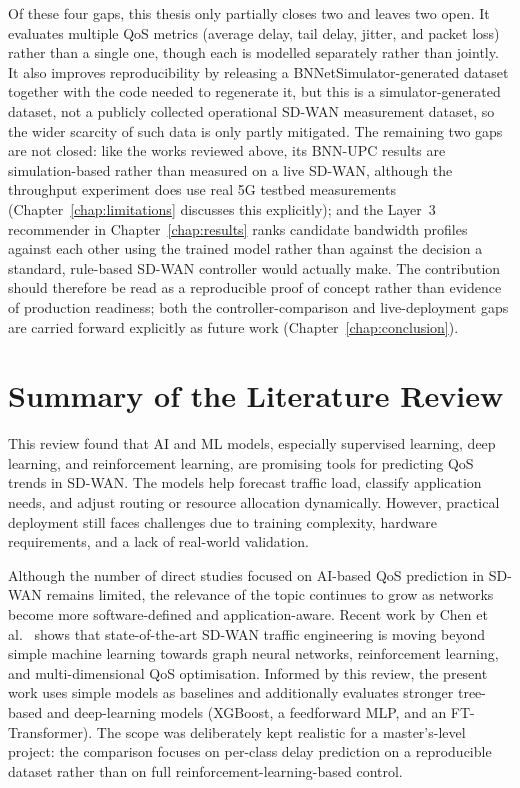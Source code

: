 \documentclass[a4paper,12pt]{Classes/RoboticsLaTeX}
\begin{document}
Of these four gaps, this thesis only partially closes two and leaves two open. It evaluates multiple QoS metrics (average delay, tail delay, jitter, and packet loss) rather than a single one, though each is modelled separately rather than jointly. It also improves reproducibility by releasing a BNNetSimulator-generated dataset together with the code needed to regenerate it, but this is a simulator-generated dataset, not a publicly collected operational SD-WAN measurement dataset, so the wider scarcity of such data is only partly mitigated. The remaining two gaps are not closed: like the works reviewed above, its BNN-UPC results are simulation-based rather than measured on a live SD-WAN, although the throughput experiment does use real 5G testbed measurements (Chapter~\ref{chap:limitations} discusses this explicitly); and the Layer~3 recommender in Chapter~\ref{chap:results} ranks candidate bandwidth profiles against each other using the trained model rather than against the decision a standard, rule-based SD-WAN controller would actually make. The contribution should therefore be read as a reproducible proof of concept rather than evidence of production readiness; both the controller-comparison and live-deployment gaps are carried forward explicitly as future work (Chapter~\ref{chap:conclusion}).

\section{Summary of the Literature Review}

This review found that AI and ML models, especially supervised learning, deep learning, and reinforcement learning, are promising tools for predicting QoS trends in SD-WAN. The models help forecast traffic load, classify application needs, and adjust routing or resource allocation dynamically. However, practical deployment still faces challenges due to training complexity, hardware requirements, and a lack of real-world validation.

Although the number of direct studies focused on AI-based QoS prediction in SD-WAN remains limited, the relevance of the topic continues to grow as networks become more software-defined and application-aware. Recent work by Chen et al.~\cite{chen2025mteal} shows that state-of-the-art SD-WAN traffic engineering is moving beyond simple machine learning towards graph neural networks, reinforcement learning, and multi-dimensional QoS optimisation. Informed by this review, the present work uses simple models as baselines and additionally evaluates stronger tree-based and deep-learning models (XGBoost, a feedforward MLP, and an FT-Transformer). The scope was deliberately kept realistic for a master's-level project: the comparison focuses on per-class delay prediction on a reproducible dataset rather than on full reinforcement-learning-based control.
\end{document}
